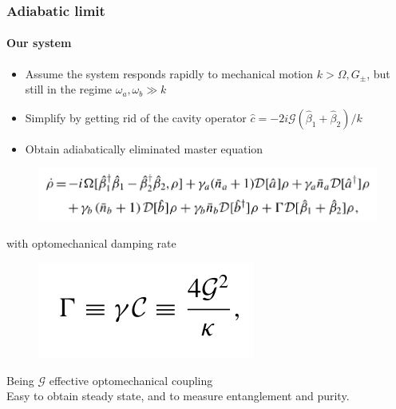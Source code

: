 \documentclass[aspectratio=43]{beamer}
\begin{document}
\begin{frame}
	
	\frametitle{Adiabatic limit}
	\framesubtitle{Our system}
	
	\begin{itemize}
		\item Assume the system responds rapidly to mechanical motion $k > \Omega, G_{\pm}$, but still in the regime $\omega_{a}, \omega_{b} \gg k$
		\item Simplify by getting rid of the cavity operator $\hat{c} = -2i\mathcal{G}(\hat{\beta}_{1} + \hat{\beta}_{2})/k$\\
		\item Obtain adiabatically eliminated master equation
	\end{itemize}

	\begin{figure}
		\includegraphics[width = 9 cm]{plots/master_eq_2.png}
	\end{figure}

	with optomechanical damping rate
	\begin{figure}
		\includegraphics[width = 3 cm]{plots/optomechanic_dumping.png}
	\end{figure}

	Being $\mathcal{G}$ effective optomechanical coupling\\
	Easy to obtain steady state, and to measure entanglement and purity.
	 
\end{frame}
\end{document}
